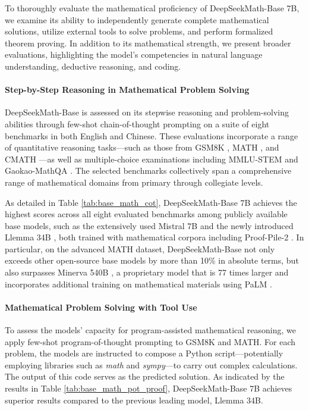 \begin{itemize}[topsep=0pt]
To thoroughly evaluate the mathematical proficiency of DeepSeekMath-Base 7B, we examine its ability to independently generate complete mathematical solutions, utilize external tools to solve problems, and perform formalized theorem proving. In addition to its mathematical strength, we present broader evaluations, highlighting the model's competencies in natural language understanding, deductive reasoning, and coding.

\paragraph{Step-by-Step Reasoning in Mathematical Problem Solving}

DeepSeekMath-Base is assessed on its stepwise reasoning and problem-solving abilities through few-shot chain-of-thought prompting \citep{cot} on a suite of eight benchmarks in both English and Chinese. These evaluations incorporate a range of quantitative reasoning tasks—such as those from GSM8K \citep{gsm8k}, MATH \citep{MATH}, and CMATH \citep{wei2023cmath}—as well as multiple-choice examinations including MMLU-STEM \citep{mmlu} and Gaokao-MathQA \citep{agieval}. The selected benchmarks collectively span a comprehensive range of mathematical domains from primary through collegiate levels.

As detailed in Table \ref{tab:base_math_cot}, DeepSeekMath-Base 7B achieves the highest scores across all eight evaluated benchmarks among publicly available base models, such as the extensively used Mistral 7B \citep{mistral} and the newly introduced Llemma 34B \citep{llemma}, both trained with mathematical corpora including Proof-Pile-2 \citep{llemma}. In particular, on the advanced MATH dataset, DeepSeekMath-Base not only exceeds other open-source base models by more than 10\% in absolute terms, but also surpasses Minerva 540B \citep{minerva}, a proprietary model that is 77 times larger and incorporates additional training on mathematical materials using PaLM \citep{palm}.

\paragraph{Mathematical Problem Solving with Tool Use} To assess the models’ capacity for program-assisted mathematical reasoning, we apply few-shot program-of-thought prompting \citep{pot,pal} to GSM8K and MATH. For each problem, the models are instructed to compose a Python script—potentially employing libraries such as \textit{math} and \textit{sympy}—to carry out complex calculations. The output of this code serves as the predicted solution. As indicated by the results in Table \ref{tab:base_math_pot_proof}, DeepSeekMath-Base 7B achieves superior results compared to the previous leading model, Llemma 34B.


\end{itemize}

